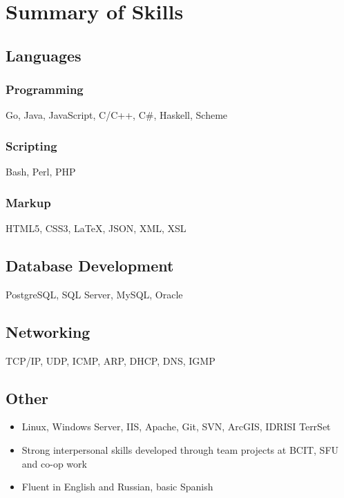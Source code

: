 \documentclass{ik_resume}
\begin{document}
\pagestyle{main}
\thispagestyle{empty}




\section{Summary of Skills}

\subsection{Languages}

\subsubsection{Programming}

Go, Java, JavaScript, C/C++, C\#, Haskell, Scheme

\subsubsection{Scripting}

Bash, Perl, PHP

\subsubsection{Markup}

HTML5, CSS3, {\LaTeX}, JSON, XML, XSL

\subsection{Database Development}

PostgreSQL, SQL Server, MySQL, Oracle

\subsection{Networking}

TCP/IP, UDP, ICMP, ARP, DHCP, DNS, IGMP

\subsection{Other}

\begin{itemize}
  \itemsep0em
  \item Linux, Windows Server, IIS, Apache, Git, SVN, ArcGIS, IDRISI TerrSet
  \item Strong interpersonal skills developed through team projects at BCIT, SFU and co-op work
  \item Fluent in English and Russian, basic Spanish
\end{itemize}
\end{document}
